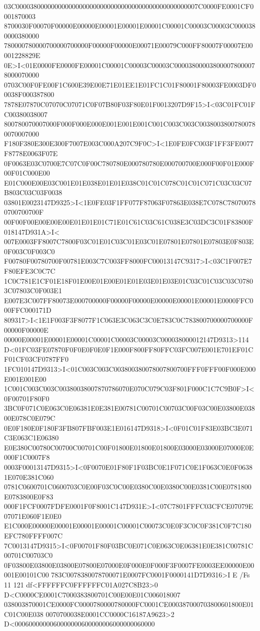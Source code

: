 03C0000380000000000000000000000000000000000000000000007C0000FE0001CF0001870003
8700030F00070F00000E00000E00001E00001E00001C00001C00003C00003C0000380000380000
780000780000700000700000F00000F00000E00071E00079C000FF80007F00007E00001228829E
0E>I<01E0000FE0000FE00001C00001C00003C00003C000038000038000078000078000070000
0703C00F0FE00F1C600E39E00E71E01EE1E01FC1C01F80001F80003FE0003DF00038F000387800
7878E07870C07070C07071C0F07B80F03F80E01F0013207D9F15>I<03C01FC01FC00380038007
800780070007000F000F000E000E001E001E001C001C003C003C00380038007800780070007000
F180F380E300E300F7007E003C000A207C9F0C>I<1E0FE0FC003F1FF3FE0077F8778E0063F07E
0F0063E03C0700E7C07C0F00C780780E000780780E000700700E000F00F01E000F00F01C000E00
E01C000E00E03C001E01E038E01E01E038C01C01C078C01C01C071C03C03C07B803C03C03F0038
03801E0023147D9325>I<1E0FE03F1FF077F87063F07863E038E7C078C780700780700700700F
00F00F00E00E00E00E01E01E01C71E01C61C03C61C038E3C03DC3C01F83800F018147D931A>I<
007E0003FF8007C7800F03C01E01C03C01E03C01E07801E07801E07803E0F803E0F003C0F003C0
F00780F00780700F00781E003C7C003FF8000FC00013147C9317>I<03C1F007E7F80EFE3C0C7C
1C0C781E1CF01E18F01E00E01E00E01E01E03E01E03E01C03C01C03C03C07803C07803C0F003E1
E007E3C007FF80073E000700000F00000F00000E00000E00001E00001E0000FFC000FFC000171D
809317>I<1E1F003F3F8077F1C063E3C063C3C0E783C0C783800700000700000F00000F00000E
00000E00001E00001E00001C00001C00003C00003C000038000012147D9313>114
D<01FC03FE07870F0F0E0F0E0F1E000F800FF80FFC03FC007E001E701EF01CF01CF03CF0787FF0
1FC010147D9313>I<01C003C003C003800380078007800700FFF0FFF00F000E000E001E001E00
1C001C003C003C00380038007870786070E070C079C03F801F000C1C7C9B0F>I<0F00701F80F0
3BC0F071C0E063C0E06381E0E381E00781C00701C00703C00F03C00E03800E03800E078C0E079C
0E0F180E0F180F3FB807FBF003E1E016147D9318>I<0F01C01F83E03BC3E071C3E063C1E06380
E0E380C00780C00700C00701C00F01800E01800E01800E03000E03000E07000E0E000F1C0007F8
0003F00013147D9315>I<0F0070E01F80F1F03BC0E1F071C0E1F063C0E0F06381E070E381C060
0781C0600701C0600703C0E00F03C0C00E0380C00E0380C00E0381C00E0781800E0783800E0F83
000F1FCF0007FDFE0001F0F8001C147D931E>I<07C7801FFFC03CFCE07079E07071E060F1E0E0
E1C000E00000E00001E00001E00001C00001C00073C0E0F3C0C0F381C0F7C180EFC780FFFF007C
7C0013147D9315>I<0F00701F80F03BC0E071C0E063C0E06381E0E381C00781C00701C00703C0
0F03800E03800E03800E07800E07000E0F000E0F000F3F0007FE0003EE00000E00001E00101C00
783C0078380078700071E0007FC0001F0000141D7D9316>I E /Fs 11 121
df<FFFFFFC0FFFFFFC01A027C8B23>0 D<C0000CE0001C7000383800701C00E00E01C006018007
038003870001CE0000FC0000780000780000FC0001CE000387000703800601800E01C01C00E038
0070700038E0001CC0000C16187A9623>2 D<0006000000060000000600000006000000060000
